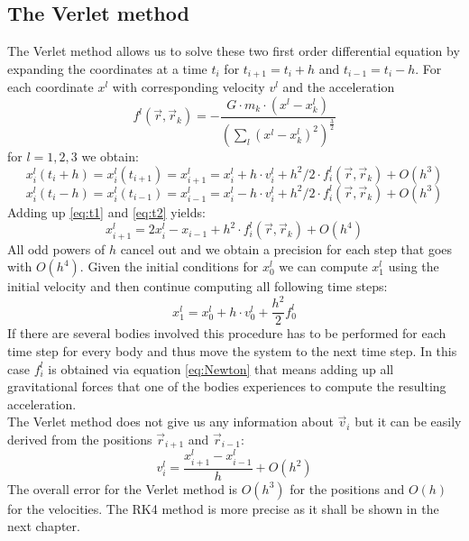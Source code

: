 \documentclass[11pt,a4wide]{article}
\begin{document}
\subsection{The Verlet method}
The Verlet method allows us to solve these two first order differential equation by expanding the coordinates at a time $t_i$ for $t_{i+1}=t_i+h$ and $t_{i-1}=t_i-h$. For each coordinate $x^l$ with corresponding velocity $v^l$ and the acceleration
\begin{equation}
f^l(\vec{r},\vec{r}_k)=-\dfrac{G\cdot m_k\cdot (x^l-x_k^l)}{\left(\displaystyle\sum_l(x^l-x_k^l)^2\right)^{\frac{3}{2}}}
\label{eq:}
\end{equation}
for $l=1,2,3$ we obtain:
\begin{equation}
x_i^l(t_i+h)=x_i^l(t_{i+1})=x^l_{i+1}=x_i^l+h\cdot v_i^l+h^2/2\cdot f_i^l(\vec{r},\vec{r}_k)+O(h^3)
\label{eq:t1}
\end{equation}
\begin{equation}
x_i^l(t_i-h)=x_i^l(t_{i-1})=x^l_{i-1}=x_i^l-h\cdot v_i^l+h^2/2\cdot f_i^l(\vec{r},\vec{r}_k)+O(h^3)
\label{eq:t2}
\end{equation}
Adding up \ref{eq:t1} and \ref{eq:t2} yields:
\begin{equation}
x^l_{i+1}=2x_i^l-x_{i-1}+h^2\cdot f_i^l(\vec{r},\vec{r}_k)+O(h^4)
\label{eq:t}
\end{equation}
All odd powers of $h$ cancel out and we obtain a precision for each step that goes with $O(h^4)$. Given the initial conditions for $x^l_0$ we can compute $x^l_1$ using the initial velocity and then continue computing all following time steps:
\begin{equation}
x^l_1=x^l_0+h\cdot v^l_0+\dfrac{h^2}{2}f_0^l
\label{eq:t0}
\end{equation}
If there are several bodies involved this procedure has to be performed for each time step for every body and thus move the system to the next time step. In this case $f_i^l$ is obtained via equation \ref{eq:Newton} that means adding up all gravitational forces that one of the bodies experiences to compute the resulting acceleration.
\\
The Verlet method does not give us any information about $\vec{v}_i$ but it can be easily derived from the positions $\vec{r}_{i+1}$ and $\vec{r}_{i-1}$:
\begin{equation}
v^l_i=\dfrac{x^l_{i+1}-x^l_{i-1}}{h}+O(h^2)
\label{eq:v}
\end{equation}
The overall error for the Verlet method is $O(h^3)$ for the positions and $O(h)$ for the velocities. The RK4 method is more precise as it shall be shown in the next chapter. 
\end{document}
